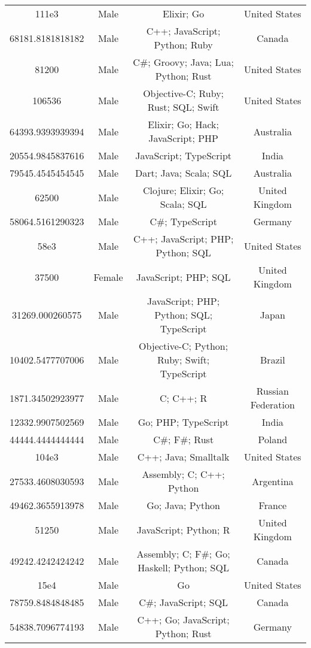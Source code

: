 \begin{center}
\begin{tabular}{ |c|c|c|c| }
111e3  &  Male  &  Elixir; Go  &  United States  \\ 
68181.8181818182  &  Male  &  C++; JavaScript; Python; Ruby  &  Canada  \\ 
81200  &  Male  &  C\#; Groovy; Java; Lua; Python; Rust  &  United States  \\ 
106536  &  Male  &  Objective-C; Ruby; Rust; SQL; Swift  &  United States  \\ 
64393.9393939394  &  Male  &  Elixir; Go; Hack; JavaScript; PHP  &  Australia  \\ 
20554.9845837616  &  Male  &  JavaScript; TypeScript  &  India  \\ 
79545.4545454545  &  Male  &  Dart; Java; Scala; SQL  &  Australia  \\ 
62500  &  Male  &  Clojure; Elixir; Go; Scala; SQL  &  United Kingdom  \\ 
58064.5161290323  &  Male  &  C\#; TypeScript  &  Germany  \\ 
58e3  &  Male  &  C++; JavaScript; PHP; Python; SQL  &  United States  \\ 
37500  &  Female  &  JavaScript; PHP; SQL  &  United Kingdom  \\ 
31269.000260575  &  Male  &  JavaScript; PHP; Python; SQL; TypeScript  &  Japan  \\ 
10402.5477707006  &  Male  &  Objective-C; Python; Ruby; Swift; TypeScript  &  Brazil  \\ 
1871.34502923977  &  Male  &  C; C++; R  &  Russian Federation  \\ 
12332.9907502569  &  Male  &  Go; PHP; TypeScript  &  India  \\ 
44444.4444444444  &  Male  &  C\#; F\#; Rust  &  Poland  \\ 
104e3  &  Male  &  C++; Java; Smalltalk  &  United States  \\ 
27533.4608030593  &  Male  &  Assembly; C; C++; Python  &  Argentina  \\ 
49462.3655913978  &  Male  &  Go; Java; Python  &  France  \\ 
51250  &  Male  &  JavaScript; Python; R  &  United Kingdom  \\ 
49242.4242424242  &  Male  &  Assembly; C; F\#; Go; Haskell; Python; SQL  &  Canada  \\ 
15e4  &  Male  &  Go  &  United States  \\ 
78759.8484848485  &  Male  &  C\#; JavaScript; SQL  &  Canada  \\ 
54838.7096774193  &  Male  &  C++; Go; JavaScript; Python; Rust  &  Germany  \\ 

\end{tabular}
\end{center}
